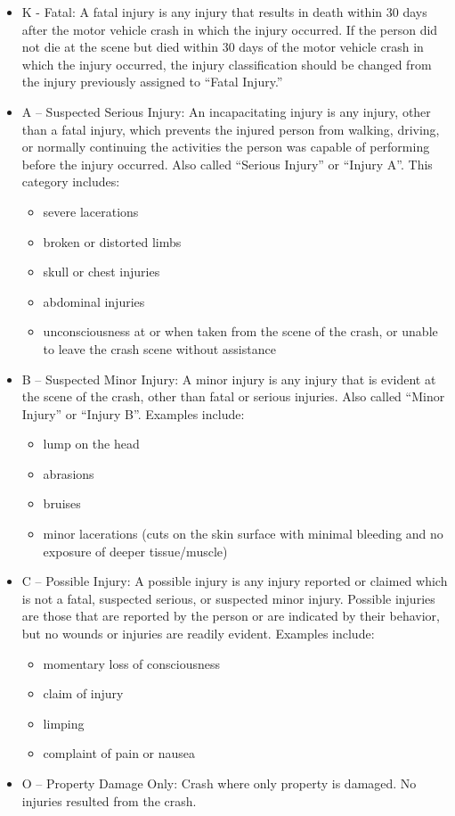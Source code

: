 \documentclass[
  letterpaper,
]{scrbook}
\providecommand{\tightlist}{%
  \setlength{\itemsep}{0pt}\setlength{\parskip}{0pt}}\usepackage{longtable,booktabs,array}
\begin{document}
\begin{itemize}
\tightlist
\item
  K - Fatal: A fatal injury is any injury that results in death within
  30 days after the motor vehicle crash in which the injury occurred. If
  the person did not die at the scene but died within 30 days of the
  motor vehicle crash in which the injury occurred, the injury
  classification should be changed from the injury previously assigned
  to ``Fatal Injury.''
\item
  A -- Suspected Serious Injury: An incapacitating injury is any injury,
  other than a fatal injury, which prevents the injured person from
  walking, driving, or normally continuing the activities the person was
  capable of performing before the injury occurred. Also called
  ``Serious Injury'' or ``Injury A''. This category includes:

  \begin{itemize}
  \tightlist
  \item
    severe lacerations
  \item
    broken or distorted limbs
  \item
    skull or chest injuries
  \item
    abdominal injuries
  \item
    unconsciousness at or when taken from the scene of the crash, or
    unable to leave the crash scene without assistance
  \end{itemize}
\item
  B -- Suspected Minor Injury: A minor injury is any injury that is
  evident at the scene of the crash, other than fatal or serious
  injuries. Also called ``Minor Injury'' or ``Injury B''. Examples
  include:

  \begin{itemize}
  \tightlist
  \item
    lump on the head
  \item
    abrasions
  \item
    bruises
  \item
    minor lacerations (cuts on the skin surface with minimal bleeding
    and no exposure of deeper tissue/muscle)
  \end{itemize}
\item
  C -- Possible Injury: A possible injury is any injury reported or
  claimed which is not a fatal, suspected serious, or suspected minor
  injury. Possible injuries are those that are reported by the person or
  are indicated by their behavior, but no wounds or injuries are readily
  evident. Examples include:

  \begin{itemize}
  \tightlist
  \item
    momentary loss of consciousness
  \item
    claim of injury
  \item
    limping
  \item
    complaint of pain or nausea
  \end{itemize}
\item
  O -- Property Damage Only: Crash where only property is damaged. No
  injuries resulted from the crash.
\end{itemize}
\end{document}
